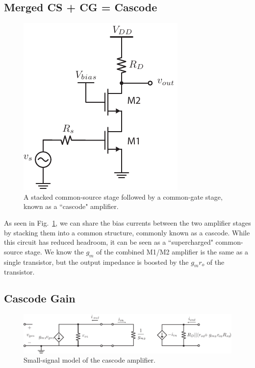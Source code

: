 
\subsection{Merged CS + CG = Cascode}


\begin{figure}[tb]
\begin{center}
\includegraphics[scale=1]{10cascode_dc}
\end{center}
\caption{A stacked common-source stage followed by a common-gate stage, known as a ``cascode" amplifier.} \label{fig:10cascode_dc}
\end{figure}


As seen in Fig.~\ref{fig:10cascode_dc}, we can share the bias currents between the two amplifier stages by stacking them into a common structure, commonly known as a cascode.  While this circuit has reduced headroom, it can be seen as a ``supercharged" common-source stage.  We know the $g_m$ of the combined M1/M2 amplifier is the same as a single transistor, but the output impedance is boosted by the $g_m r_o$ of the transistor.
 


\subsection{Cascode Gain}


\begin{figure}[tb]
\begin{center}
\includegraphics[scale=1]{11cascode_ss}
\end{center}
\caption{Small-signal model of the cascode amplifier.} \label{fig:11cascode_ss}
\end{figure}

